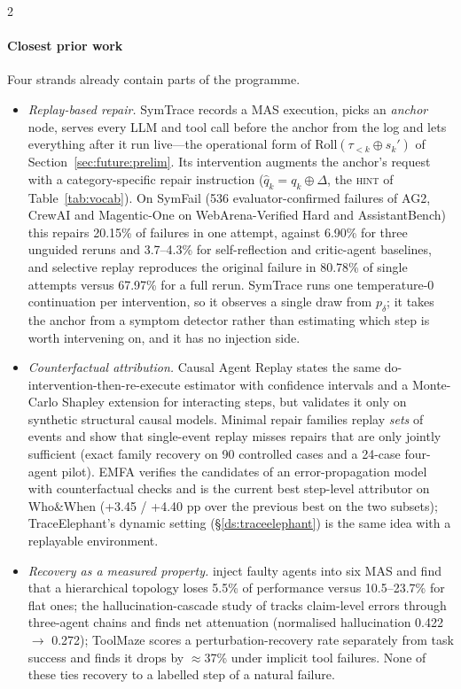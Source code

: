 \begin{multicols}{2}
\paragraph{Closest prior work} Four strands already contain parts of the programme.
\begin{itemize}[leftmargin=1.1em]
\item \emph{Replay-based repair.} SymTrace \cite{luan2026symtrace} records a MAS execution, picks an \emph{anchor} node, serves every LLM and tool call before the anchor from the log and lets everything after it run live---the operational form of $\mathrm{Roll}(\tau_{<k}\oplus s_k')$ of Section~\ref{sec:future:prelim}. Its intervention augments the anchor's request with a category-specific repair instruction ($\hat q_k=q_k\oplus\Delta$, the \textsc{hint} of Table~\ref{tab:vocab}). On SymFail (536 evaluator-confirmed failures of AG2, CrewAI and Magentic-One on WebArena-Verified Hard and AssistantBench) this repairs 20.15\% of failures in one attempt, against 6.90\% for three unguided reruns and 3.7--4.3\% for self-reflection and critic-agent baselines, and selective replay reproduces the original failure in 80.78\% of single attempts versus 67.97\% for a full rerun. SymTrace runs one temperature-0 continuation per intervention, so it observes a single draw from $p_\delta$; it takes the anchor from a symptom detector rather than estimating which step is worth intervening on, and it has no injection side.
\item \emph{Counterfactual attribution.} Causal Agent Replay \cite{shah2026car} states the same do-intervention-then-re-execute estimator with confidence intervals and a Monte-Carlo Shapley extension for interacting steps, but validates it only on synthetic structural causal models. Minimal repair families \cite{li2026mrfr} replay \emph{sets} of events and show that single-event replay misses repairs that are only jointly sufficient (exact family recovery on 90 controlled cases and a 24-case four-agent pilot). EMFA \cite{liao2026emfa} verifies the candidates of an error-propagation model with counterfactual checks and is the current best step-level attributor on Who\&When (+3.45 / +4.40 pp over the previous best on the two subsets); TraceElephant's dynamic setting (\S\ref{ds:traceelephant}) is the same idea with a replayable environment.
\item \emph{Recovery as a measured property.} \citet{huang2024resilience} inject faulty agents into six MAS and find that a hierarchical topology loses 5.5\% of performance versus 10.5--23.7\% for flat ones; the hallucination-cascade study of \citet{jamshidi2026cascade} tracks claim-level errors through three-agent chains and finds net attenuation (normalised hallucination 0.422 $\to$ 0.272); ToolMaze \cite{zhu2026toolmaze} scores a perturbation-recovery rate separately from task success and finds it drops by $\approx$37\% under implicit tool failures. None of these ties recovery to a labelled step of a natural failure.

\end{itemize}
\end{multicols}

